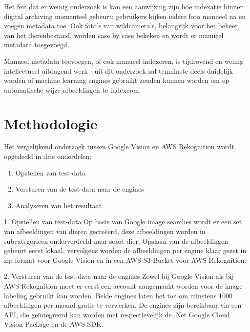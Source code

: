 Het feit dat er weinig onderzoek is kan een aanwijzing zijn hoe indexatie binnen digital archiving momenteel gebeurt: gebruikers kijken iedere foto manueel na en voegen metadata toe. Ook foto's van wildcamera's, belangrijk voor het beheer van het dierenbestand, worden case by case bekeken en wordt er manueel metadata toegevoegd.

Manueel metadata toevoegen, of ook manueel indexeren, is tijdrovend en weinig intellectueel uitdagend werk - uit dit onderzoek zal tenminste deels duidelijk worden of machine learning engines gebruikt zouden kunnen worden om op automatische wijze afbeeldingen te indexeren.   




\section{Methodologie}
\label{sec:methodologie}

Het vergelijkend onderzoek tussen Google Vision en AWS Rekognition wordt opgedeeld in drie onderdelen:

\begin{enumerate}
    \item Opstellen van test-data
    \item Versturen van de test-data naar de engines
    \item Analyseren van het resultaat
\end{enumerate}

1. Opstellen van test-data
\linebreak
Op basis van Google image searches wordt er een set van afbeeldingen van dieren gecreëerd, deze afbeeldingen worden in subcategorieen onderverdeeld naar soort dier.
Opslaan van de afbeeldingen gebeurt eerst lokaal, vervolgens worden de afbeeldingen per engine klaar gezet in zip format voor Google Vision en in een AWS S3 Bucket voor AWS Rekognition.

2. Versturen van de test-data naar de engines
\linebreak
Zowel bij Google Vision als bij AWS Rekognition moet er eerst een account aangemaakt worden voor de image labeling gebruikt kan worden. Beide engines laten het toe om minstens 1000 afbeeldingen per maand gratis te verwerken. De engines zijn bereikbaar via een API, die geïntegreerd kan worden met respectievelijk de .Net Google Cloud Vision Package en de AWS SDK.

